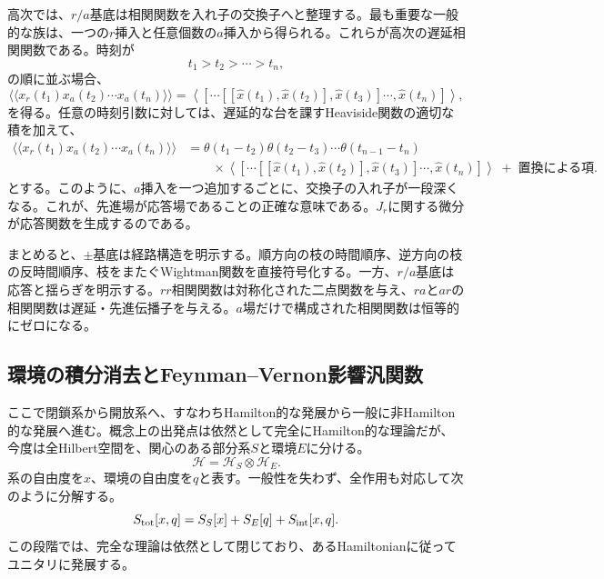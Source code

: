 \documentclass[a4paper,11pt,oneside]{article}
\theoremstyle{definition}
\numberwithin{equation}{section}
\begin{document}
高次では、$r/a$基底は相関関数を入れ子の交換子へと整理する。最も重要な一般的な族は、一つの$r$挿入と任意個数の$a$挿入から得られる。これらが高次の遅延相関関数である。時刻が
\begin{equation}
t_1>t_2>\cdots>t_n ,
\end{equation}
の順に並ぶ場合、
\begin{equation}\label{higherretarded}
\langle\!\langle x_r(t_1)x_a(t_2)\cdots x_a(t_n)\rangle\!\rangle
=
\left\langle
[\cdots[[\hat x(t_1),\hat x(t_2)],\hat x(t_3)]\cdots,\hat x(t_n)]
\right\rangle ,
\end{equation}
を得る。任意の時刻引数に対しては、遅延的な台を課すHeaviside関数の適切な積を加えて、
\begin{align}
\langle\!\langle x_r(t_1)x_a(t_2)\cdots x_a(t_n)\rangle\!\rangle
&=
\theta(t_1-t_2)\theta(t_2-t_3)\cdots\theta(t_{n-1}-t_n)
\nonumber\\
&\qquad\times
\left\langle
[\cdots[[\hat x(t_1),\hat x(t_2)],\hat x(t_3)]\cdots,\hat x(t_n)]
\right\rangle
\;+\; \text{置換による項} .
\end{align}
とする。このように、$a$挿入を一つ追加するごとに、交換子の入れ子が一段深くなる。これが、先進場が応答場であることの正確な意味である。$  J_{r} $に関する微分が応答関数を生成するのである。



まとめると、$\pm$基底は経路構造を明示する。順方向の枝の時間順序、逆方向の枝の反時間順序、枝をまたぐWightman関数を直接符号化する。一方、$r/a$基底は応答と揺らぎを明示する。$rr$相関関数は対称化された二点関数を与え、$ra$と$ar$の相関関数は遅延・先進伝播子を与える。$a$場だけで構成された相関関数は恒等的にゼロになる。





\subsection{環境の積分消去とFeynman--Vernon影響汎関数}



ここで閉鎖系から開放系へ、すなわちHamilton的な発展から一般に非Hamilton的な発展へ進む。概念上の出発点は依然として完全にHamilton的な理論だが、今度は全Hilbert空間を、関心のある部分系$ S$と環境$ E$に分ける。
\begin{equation}
\mathcal H = \mathcal H_S \otimes \mathcal H_E .
\end{equation}
系の自由度を\(x\)、環境の自由度を\(q\)と表す。一般性を失わず、全作用も対応して次のように分解する。
\begin{equation}
S_{\rm tot}[x,q]
=
S_S[x] + S_E[q] + S_{\rm int}[x,q] .
\end{equation}
この段階では、完全な理論は依然として閉じており、あるHamiltonianに従ってユニタリに発展する。
\end{document}
